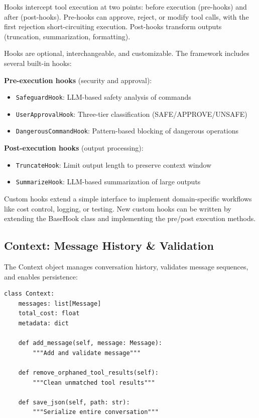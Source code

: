 \documentclass{article}
\begin{document}
Hooks intercept tool execution at two points: before execution (pre-hooks) and after (post-hooks). Pre-hooks can approve, reject, or modify tool calls, with the first rejection short-circuiting execution. Post-hooks transform outputs (truncation, summarization, formatting).

Hooks are optional, interchangeable, and customizable. The framework includes several built-in hooks:

\textbf{Pre-execution hooks} (security and approval):
\begin{itemize}
    \item \texttt{SafeguardHook}: LLM-based safety analysis of commands
    \item \texttt{UserApprovalHook}: Three-tier classification (SAFE/APPROVE/UNSAFE)
    \item \texttt{DangerousCommandHook}: Pattern-based blocking of dangerous operations
\end{itemize}

\textbf{Post-execution hooks} (output processing):
\begin{itemize}
    \item \texttt{TruncateHook}: Limit output length to preserve context window
    \item \texttt{SummarizeHook}: LLM-based summarization of large outputs
\end{itemize}

Custom hooks extend a simple interface to implement domain-specific workflows like cost control, logging, or testing. New custom hooks can be written by extending the BaseHook class and implementing the pre/post execution methods.

\subsection{Context: Message History \& Validation}

The Context object manages conversation history, validates message sequences, and enables persistence:

\begin{verbatim}
class Context:
    messages: list[Message]
    total_cost: float
    metadata: dict

    def add_message(self, message: Message):
        """Add and validate message"""

    def remove_orphaned_tool_results(self):
        """Clean unmatched tool results"""

    def save_json(self, path: str):
        """Serialize entire conversation"""
\end{verbatim}
\end{document}
